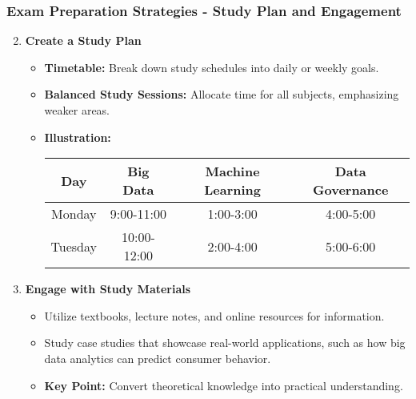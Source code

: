 \documentclass[aspectratio=169]{beamer}
\begin{document}
\begin{frame}[fragile]
    \frametitle{Exam Preparation Strategies - Study Plan and Engagement}
    \begin{enumerate}
        \setcounter{enumi}{1}
        \item \textbf{Create a Study Plan}
        \begin{itemize}
            \item \textbf{Timetable:} Break down study schedules into daily or weekly goals.
            \item \textbf{Balanced Study Sessions:} Allocate time for all subjects, emphasizing weaker areas.
            \item \textbf{Illustration:}
            \begin{center}
                \begin{tabular}{|c|c|c|c|}
                    \hline
                    Day & Big Data & Machine Learning & Data Governance \\
                    \hline
                    Monday & 9:00-11:00 & 1:00-3:00 & 4:00-5:00 \\
                    \hline
                    Tuesday & 10:00-12:00 & 2:00-4:00 & 5:00-6:00 \\
                    \hline
                \end{tabular}
            \end{center}
        \end{itemize}
        
        \item \textbf{Engage with Study Materials}
        \begin{itemize}
            \item Utilize textbooks, lecture notes, and online resources for information.
            \item Study case studies that showcase real-world applications, such as how big data analytics can predict consumer behavior.
            \item \textbf{Key Point:} Convert theoretical knowledge into practical understanding.
        \end{itemize}
    \end{enumerate}
\end{frame}
\end{document}
